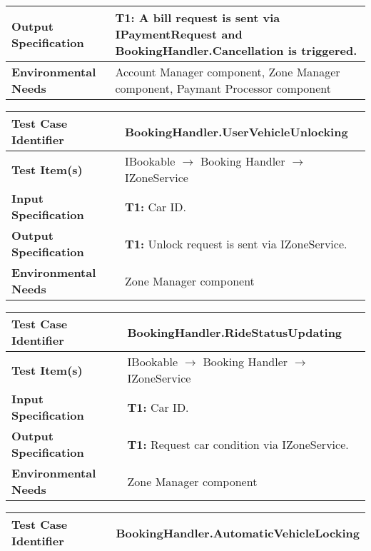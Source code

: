 {\begin{tabularx}{\textwidth}{l X}
    \textbf{Output Specification} & \textbf{T1:} A bill request is sent via IPaymentRequest and BookingHandler.Cancellation is triggered.  \\
    \hline 
    
    \textbf{Environmental Needs} & Account Manager component, Zone Manager component, Paymant Processor component\\
    \hline
\end{tabularx}
\bigskip 

\noindent
\begin{tabularx}{\textwidth}{l X}
    \hline 
    \textbf{Test Case Identifier} & BookingHandler.UserVehicleUnlocking\\ 
    \hline 
    
    \textbf{Test Item(s)} & IBookable $\rightarrow$ Booking Handler $\rightarrow$ IZoneService\\
    \hline 
    
    \textbf{Input Specification} & \textbf{T1:} Car ID.\\
    \hline 
    
    \textbf{Output Specification} & \textbf{T1:} Unlock request is sent via IZoneService.  \\
    \hline 
    
    \textbf{Environmental Needs} & Zone Manager component\\
    \hline
\end{tabularx}
\bigskip 

\noindent
\begin{tabularx}{\textwidth}{l X}
    \hline 
    \textbf{Test Case Identifier} & BookingHandler.RideStatusUpdating\\ 
    \hline 
    
    \textbf{Test Item(s)} & IBookable $\rightarrow$ Booking Handler $\rightarrow$ IZoneService\\
    \hline 
    
    \textbf{Input Specification} & \textbf{T1:} Car ID.\\
    \hline 
    
    \textbf{Output Specification} & \textbf{T1:} Request car condition via IZoneService.\\
    \hline 
    
    \textbf{Environmental Needs} & Zone Manager component\\
    \hline
\end{tabularx}
\bigskip 

\noindent
\begin{tabularx}{\textwidth}{l X}
    \hline 
    \textbf{Test Case Identifier} & BookingHandler.AutomaticVehicleLocking\\ 
    \hline 
    

\end{tabularx}}
